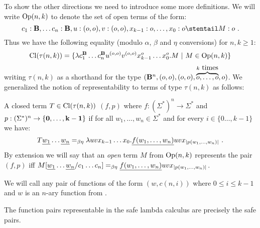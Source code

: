 To show the other directions we need to introduce some more definitions.
We will write ${\rm Op}(n,k)$ to denote the set of open terms
of the form:
$$c_1:\zaiwordtyp, \ldots c_n :\zaiwordtyp, u:(o,o), v:(o,o), x_{k-1}:o, \ldots, x_0 :o \stentail M : o \ .$$
Thus we have the following equality (modulo $\alpha$, $\beta$ and
$\eta$ conversions) for $n,k\geq1$:
$${\rm Cl}(\tau(n,k)) = \{ \lambda c_1^{\mathbf{B}} \ldots c_n^{\mathbf{B}} u^{(o,o)} v^{(o,o)} x_{k-1}^o \ldots x_0^o . M \ | \ M \in {\rm Op}(n,k)  \} $$
writing $\tau(n,k)$ as a shorthand for the type
$(\mathbf{B}^n,(o,o),(o,o),\overbrace{o,\ldots,o}^{k\hbox{
times}},o)$. We generalized the notion of representability to terms
of type $\tau(n,k)$ as follows:
\begin{definition}
A closed term $T\in{\rm Cl}(\tau(n,k))$ 
$(f,p)$ where $f:(\Sigma^*)^n \rightarrow \Sigma^*$ and $p:(\Sigma^*)^n \rightarrow \{\mathbf{0}, \ldots, \mathbf{k-1}\}$ if for all $w_1,\ldots,w_n\in\Sigma^*$
and for every $i\in \{0\ldots,k-1\}$ we have:
$$
T \zaioncencode{w_1} \ldots \zaioncencode{w_n} =_{\beta\eta} \lambda u v x_{k-1}\ldots x_0 . \zaioncencode{f(w_1,\ldots,w_n)} u v x_{|p(w_1,\ldots,w_n)|} \ .
$$
By extension we will say that an \emph{open} term $M$ from ${\rm Op}(n,k)$
represents the pair $(f,p)$
iff $M[\underline{w_1}\ldots \underline{w_n}/c_1\ldots c_n] =_{\beta\eta} \underline{f(w_1,\ldots,w_n)} u v x_{|p(w_1,\ldots,w_n)|}$.
\end{definition}

We will call  any pair of functions of the form
$(w,c(n,i))$ where $0\leq i\leq k-1$ and $w$ is an $n$-ary function
from \safedefset.

\begin{theorem}
\label{thm:zaionc_pair_characterization_safe} The function pairs
representable in the safe lambda calculus are precisely the safe
pairs.
\end{theorem}


